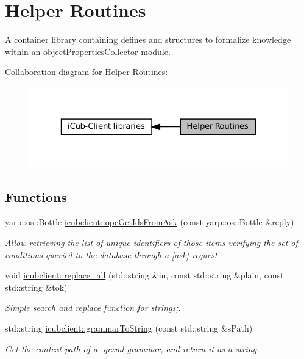\hypertarget{group__icubclient__helpers}{}\section{Helper Routines}
\label{group__icubclient__helpers}


A container library containing defines and structures to formalize knowledge within an object\+Properties\+Collector module.  


Collaboration diagram for Helper Routines\+:
\nopagebreak
\begin{figure}[H]
\begin{center}
\leavevmode
\includegraphics[width=323pt]{group__icubclient__helpers}
\end{center}
\end{figure}
\subsection*{Functions}
\begin{DoxyCompactItemize}
\item 
yarp\+::os\+::\+Bottle \hyperlink{group__icubclient__helpers_ga8acf76546a060893d573c697403e4196}{icubclient\+::opc\+Get\+Ids\+From\+Ask} (const yarp\+::os\+::\+Bottle \&reply)
\begin{DoxyCompactList}\small\item\em Allow retrieving the list of unique identifiers of those items verifying the set of conditions queried to the database through a \mbox{[}ask\mbox{]} request. \end{DoxyCompactList}\item 
void \hyperlink{group__icubclient__helpers_ga2f96d56ceecf459408d38f01ebce1111}{icubclient\+::replace\+\_\+all} (std\+::string \&in, const std\+::string \&plain, const std\+::string \&tok)
\begin{DoxyCompactList}\small\item\em Simple search and replace function for strings;. \end{DoxyCompactList}\item 
std\+::string \hyperlink{group__icubclient__helpers_gaf5d181da46b2680f90cb7b0df1fd7068}{icubclient\+::grammar\+To\+String} (const std\+::string \&s\+Path)
\begin{DoxyCompactList}\small\item\em Get the context path of a .grxml grammar, and return it as a string. \end{DoxyCompactList}\end{DoxyCompactItemize}


